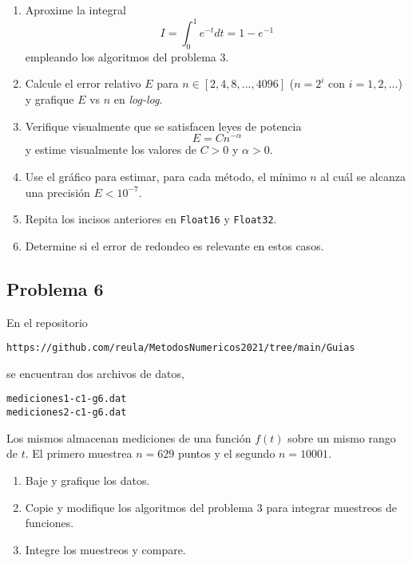 \documentclass[11pt]{article}
\begin{document}
\begin{enumerate}
\def\labelenumi{\arabic{enumi}.}
\item
  Aproxime la integral \begin{equation*}
  I = \int_0^1 e^{-t} dt = 1 - e^{-1}  \nonumber              
  \end{equation*} empleando los algoritmos del problema 3.
\item
  Calcule el error relativo \(E\) para \(n\in [2,4,8,...,4096]\)
  (\(n=2^i\) con \(i=1,2,...\)) y grafique \(E\) vs \(n\) en
  \emph{log-log}.
\item
  Verifique visualmente que se satisfacen leyes de potencia \[
  E = Cn^{-\alpha}
  \] y estime visualmente los valores de \(C>0\) y \(\alpha>0\).
\item
  Use el gráfico para estimar, para cada método, el mínimo \(n\) al cuál
  se alcanza una precisión \(E<10^{-7}\).
\item
  Repita los incisos anteriores en \texttt{Float16} y \texttt{Float32}.
\item
  Determine si el error de redondeo es relevante en estos casos.
\end{enumerate}

    \hypertarget{problema-6}{%
\subsection{Problema 6}\label{problema-6}}

En el repositorio

\begin{verbatim}
https://github.com/reula/MetodosNumericos2021/tree/main/Guias
\end{verbatim}

se encuentran dos archivos de datos,

\begin{verbatim}
mediciones1-c1-g6.dat 
mediciones2-c1-g6.dat
\end{verbatim}

Los mismos almacenan mediciones de una función \(f(t)\) sobre un mismo
rango de \(t\). El primero muestrea \(n=629\) puntos y el segundo
\(n=10001\).

\begin{enumerate}
\def\labelenumi{\arabic{enumi}.}
\item
  Baje y grafique los datos.
\item
  Copie y modifique los algoritmos del problema 3 para integrar
  muestreos de funciones.
\item
  Integre los muestreos y compare.
\end{enumerate}
\end{document}
